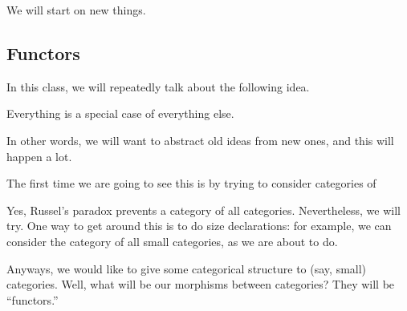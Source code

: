 \documentclass[../notes.tex]{subfiles}
\begin{document}

We will start on new things.

\subsection{Functors}
In this class, we will repeatedly talk about the following idea.
\begin{idea}
	Everything is a special case of everything else.
\end{idea}
In other words, we will want to abstract old ideas from new ones, and this will happen a lot.

The first time we are going to see this is by trying to consider categories of 
\begin{remark}
	Yes, Russel's paradox prevents a category of all categories. Nevertheless, we will try. One way to get around this is to do size declarations: for example, we can consider the category of all small categories, as we are about to do.
\end{remark}
Anyways, we would like to give some categorical structure to (say, small) categories. Well, what will be our morphisms between categories? They will be ``functors.''
\end{document}
